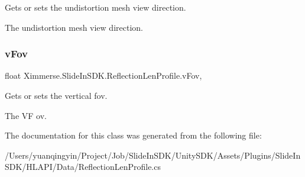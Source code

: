 Gets or sets the undistortion mesh view direction. 

The undistortion mesh view direction.\mbox{\label{class_ximmerse_1_1_slide_in_s_d_k_1_1_reflection_len_profile_a9dc5f6ec4fd34ea1daf643c08e780f3d}} 
\subsubsection{\texorpdfstring{v\+Fov}{vFov}}
{\footnotesize\ttfamily float Ximmerse.\+Slide\+In\+S\+D\+K.\+Reflection\+Len\+Profile.\+v\+Fov\hspace{0.3cm}{\ttfamily [get]}, {\ttfamily [set]}}



Gets or sets the vertical fov. 

The VF ov.

The documentation for this class was generated from the following file\+:\begin{DoxyCompactItemize}
\item 
/\+Users/yuanqingyin/\+Project/\+Job/\+Slide\+In\+S\+D\+K/\+Unity\+S\+D\+K/\+Assets/\+Plugins/\+Slide\+In\+S\+D\+K/\+H\+L\+A\+P\+I/\+Data/Reflection\+Len\+Profile.\+cs\end{DoxyCompactItemize}
